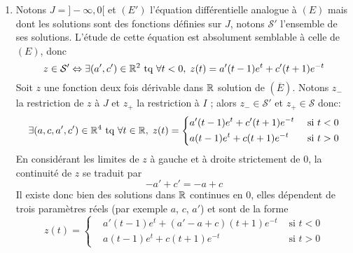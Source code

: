 \begin{enumerate}
  \item Notons $J=]-\infty, 0[$ et $(E')$ l'équation différentielle analogue à $(E)$ mais dont les solutions sont des fonctions définies sur $J$, notons $\mathcal{S}'$ l'ensemble de ses solutions. L'étude de cette équation est absolument semblable à celle de $(E)$, donc
\begin{displaymath}
z\in \mathcal{S}' \Leftrightarrow \exists (a',c')\in \mathbb{R}^2 \text{ tq } \forall t <0, \; z(t) = a'(t-1)e^t + c'(t+1)e^{-t}  
\end{displaymath}
Soit $z$ une fonction deux fois dérivable dans $\mathbb{R}$ solution de $(\overline{E})$. Notons $z_-$ la restriction de $z$ à $J$ et $z_+$ la restriction à $I$ ; alors $z_-\in \mathcal{S}'$ et $z_+\in \mathcal{S}$ donc:
\begin{displaymath}
\exists (a,c,a',c')\in \mathbb{R}^4 \text{ tq } \forall t\in \mathbb{R},\;
z(t)=
\left\lbrace 
\begin{aligned}
  &a'(t-1)e^t + c'(t+1)e^{-t} &\text{ si } t < 0\\
  &a(t-1)e^t + c(t+1)e^{-t} &\text{ si } t > 0
\end{aligned}
\right. 
\end{displaymath}
En considérant les limites de $z$ à gauche et à droite strictement de $0$, la continuité de $z$ se traduit par
\begin{displaymath}
  -a' + c' = -a + c
\end{displaymath}
Il existe donc bien des solutions dans $\mathbb{R}$ continues en $0$, elles dépendent de trois paramètres réels (par exemple $a$, $c$, $a'$) et sont de la forme
\begin{displaymath}
z(t)=
\left\lbrace 
\begin{aligned}
  &a'(t-1)e^t + (a'-a+c)(t+1)e^{-t} &\text{ si } t < 0\\
  &a(t-1)e^t + c(t+1)e^{-t} &\text{ si } t > 0
\end{aligned}
\right. 
\end{displaymath}
\end{enumerate}
